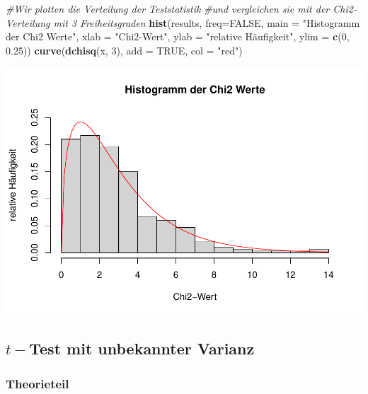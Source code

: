 \documentclass[]{article}
\newenvironment{Shaded}{\begin{snugshade}}{\end{snugshade}}
\newcommand{\CommentTok}[1]{\textcolor[rgb]{0.56,0.35,0.01}{\textit{#1}}}
\newcommand{\DataTypeTok}[1]{\textcolor[rgb]{0.13,0.29,0.53}{#1}}
\newcommand{\DecValTok}[1]{\textcolor[rgb]{0.00,0.00,0.81}{#1}}
\newcommand{\FloatTok}[1]{\textcolor[rgb]{0.00,0.00,0.81}{#1}}
\newcommand{\KeywordTok}[1]{\textcolor[rgb]{0.13,0.29,0.53}{\textbf{#1}}}
\newcommand{\NormalTok}[1]{#1}
\newcommand{\OtherTok}[1]{\textcolor[rgb]{0.56,0.35,0.01}{#1}}
\newcommand{\StringTok}[1]{\textcolor[rgb]{0.31,0.60,0.02}{#1}}
\begin{document}
\begin{Shaded}
\begin{Highlighting}[]
\CommentTok{#Wir plotten die Verteilung der Teststatistik }
\CommentTok{#und vergleichen sie mit der Chi2-Verteilung mit 3 Freiheitsgraden}
\KeywordTok{hist}\NormalTok{(results, }\DataTypeTok{freq=}\OtherTok{FALSE}\NormalTok{, }\DataTypeTok{main =} \StringTok{"Histogramm der Chi2 Werte"}\NormalTok{, }\DataTypeTok{xlab =} \StringTok{"Chi2-Wert"}\NormalTok{,}
     \DataTypeTok{ylab =} \StringTok{"relative Häufigkeit"}\NormalTok{, }\DataTypeTok{ylim =} \KeywordTok{c}\NormalTok{(}\DecValTok{0}\NormalTok{, }\FloatTok{0.25}\NormalTok{))}
\KeywordTok{curve}\NormalTok{(}\KeywordTok{dchisq}\NormalTok{(x, }\DecValTok{3}\NormalTok{), }\DataTypeTok{add =} \OtherTok{TRUE}\NormalTok{, }\DataTypeTok{col =} \StringTok{"red"}\NormalTok{)}
\end{Highlighting}
\end{Shaded}

\includegraphics{Test_files/figure-latex/unnamed-chunk-3-1.pdf}

\hypertarget{t-test-mit-unbekannter-varianz}{%
\subsection{\texorpdfstring{\(t-\)Test mit unbekannter Varianz}{t-Test mit unbekannter Varianz}}\label{t-test-mit-unbekannter-varianz}}

\hypertarget{theorieteil-1}{%
\subsubsection{Theorieteil}\label{theorieteil-1}}
\end{document}
